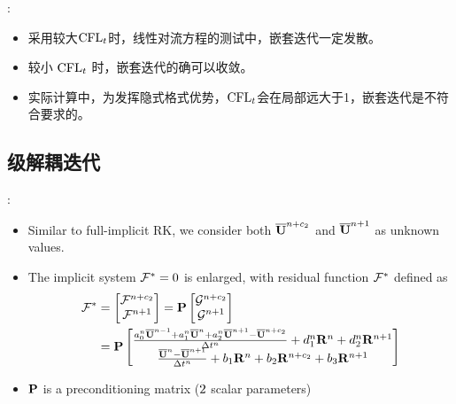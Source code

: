 \documentclass[aspectratio=169,serif]{beamer} %
\begin{document}
\begin{frame}{\secname: \subsecname}
  \begin{itemize}
    \item 采用较大$\text{CFL}_t$时，线性对流方程的测试中，嵌套迭代一定发散。
    \item 较小 $\text{CFL}_t$ 时，嵌套迭代的确可以收敛。
    \item 实际计算中，为发挥隐式格式优势，$\text{CFL}_t$会在局部远大于1，嵌套迭代是不符合要求的。
  \end{itemize}
\end{frame}

\subsection{级解耦迭代}

\begin{frame}{\secname: \subsecname}
  \begin{itemize}
    \item Similar to full-implicit RK, we consider both $\overline{\mathbf{U}}^{n+c_2}$ and
          $\overline{\mathbf{U}}^{n+1}$ as unknown values.
    \item The implicit system $\mathcal{F}^*=0$ is enlarged, with residual function $\mathcal{F}^*$ defined as
          \begin{equation}
            \begin{aligned}
              \mathcal{F}^* & =\begin{bmatrix}
                         \mathcal{F}^{n+c_2} \\
                         \mathcal{F}^{n+1}
                       \end{bmatrix} = \mathbf{P}\begin{bmatrix}
                                            \mathcal{G}^{n+c_2} \\
                                            \mathcal{G}^{n+1}
                                          \end{bmatrix} \\ & = \mathbf{P}\begin{bmatrix}
                \frac{a^n_0\overline{\mathbf{U}}^{n - 1} +
                  a^n_1\overline{\mathbf{U}}^{n} +
                  a^n_2\overline{\mathbf{U}}^{n + 1} - \overline{\mathbf{U}}^{n+c_2}}{{\Delta} t^n}
                +
                d^n_1\mathbf{R}^{n} +
                d^n_2\mathbf{R}^{n + 1}
                \\
                \frac{\overline{\mathbf{U}}^{n} - \overline{\mathbf{U}}^{n+1}}{{\Delta} t^n}  +
                b_1 \mathbf{R}^n +
                b_2 \mathbf{R}^{n+c_2} +
                b_3 \mathbf{R}^{n+1}
              \end{bmatrix}
              \label{eq:DITRFFDef}
            \end{aligned}
          \end{equation}
    \item $\mathbf{P}$ is a preconditioning matrix ($2\time 2$ scalar parameters)
  \end{itemize}
\end{frame}
\end{document}
